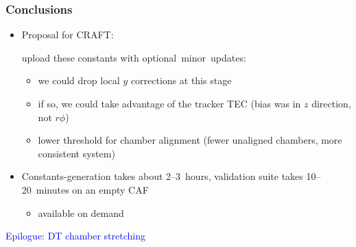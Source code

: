 \documentclass[compress]{beamer}
\begin{document}
\begin{frame}
\frametitle{Conclusions}
\begin{itemize}\setlength{\itemsep}{0.2 cm}
\item Proposal for CRAFT:

\vspace{0.1 cm}
upload these constants with \mbox{optional minor updates:\hspace{-1 cm}}
\begin{itemize}
\item we could drop local $y$ corrections at this stage
\item if so, we could take advantage of the tracker TEC (bias was in $z$ direction, not $r\phi$)
\item lower threshold for chamber alignment (fewer unaligned chambers, more consistent system)
\end{itemize}

\item Constants-generation takes about 2--3~hours, validation suite takes 10--20~minutes on an empty CAF
\begin{itemize}
\item available on demand
\end{itemize}
\end{itemize}

\vfill

\label{numpages}
\end{frame}

\begin{frame}
\begin{center}
\Huge \textcolor{blue}{Epilogue: DT chamber stretching}
\end{center}
\end{frame}
\end{document}
